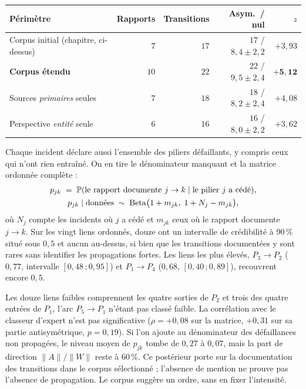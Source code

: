 \begin{center}\small
\renewcommand{\arraystretch}{1.25}
\begin{tabular}{@{}l r r r r@{}}
\toprule
\textbf{Périmètre} & \textbf{Rapports} & \textbf{Transitions} & \textbf{Asym.\ / nul} & $z$ \\
\midrule
Corpus initial (chapitre, ci-dessus) & $7$ & $17$ & $17$ / $8{,}4\pm2{,}2$ & $+3{,}93$ \\
\textbf{Corpus étendu} & $10$ & $22$ & $22$ / $9{,}5\pm2{,}4$ & $\mathbf{+5{,}12}$ \\
Sources \emph{primaires} seules & $7$ & $18$ & $18$ / $8{,}2\pm2{,}4$ & $+4{,}08$ \\
Perspective \emph{entité} seule & $6$ & $16$ & $16$ / $8{,}0\pm2{,}2$ & $+3{,}62$ \\
\bottomrule
\end{tabular}
\end{center}

\vspace{2pt}
\noindent Chaque incident déclare aussi l'ensemble des piliers défaillants, y compris ceux qui n'ont
rien entraîné. On en tire le dénominateur manquant et la matrice ordonnée complète :
\begin{equation}
\begin{gathered}
  p_{jk} \;=\; \mathbb{P}(\text{le rapport documente } j\to k \mid \text{le pilier } j \text{ a cédé}),
  \\
  p_{jk}\mid\text{données} \;\sim\; \mathrm{Beta}\bigl(1+m_{jk},\;1+N_j-m_{jk}\bigr),
\end{gathered}
  \label{eq:pjk}
\end{equation}
où $N_j$ compte les incidents où $j$ a cédé et $m_{jk}$ ceux où le rapport documente $j\to k$. Sur les
vingt liens ordonnés, douze ont un intervalle de crédibilité à $90\,\%$ situé sous $0{,}5$ et aucun au-dessus, si bien
que les transitions documentées y sont rares sans identifier les propagations fortes. Les liens les plus élevés,
$P_3\to P_2$ ($0{,}77$, intervalle $[0{,}48\,;0{,}95]$) et $P_1\to P_4$ ($0{,}68$, $[0{,}40\,;0{,}89]$),
recouvrent encore $0{,}5$.

Les douze liens faibles comprennent les quatre sorties de $P_2$ et trois des quatre entrées de $P_1$,
l'arc $P_5 \to P_1$ n'étant pas classé faible. La corrélation avec le classeur d'expert n'est pas
significative ($\rho=+0{,}08$ sur la matrice, $+0{,}31$ sur sa partie antisymétrique, $p=0{,}19$).
Si l'on ajoute au dénominateur des défaillances non propagées, le niveau moyen de $p_{jk}$ tombe de
$0{,}27$ à $0{,}07$, mais la part de direction $\lVert A\rVert/\lVert W\rVert$ reste à $60\,\%$.
Ce postérieur porte sur la documentation des transitions dans le corpus sélectionné ; l'absence de mention ne prouve pas l'absence de propagation. Le corpus suggère un ordre, sans en fixer l'intensité.


